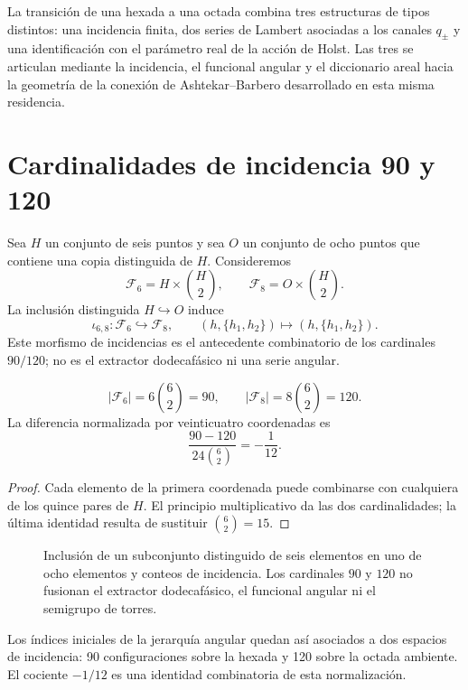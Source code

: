 \label{mdg:chap:barbero}

La transición de una hexada a una octada combina tres estructuras de tipos
distintos: una incidencia finita, dos series de Lambert asociadas a los
canales \(q_\pm\) y una identificación con el parámetro real de la acción de
Holst. Las tres se articulan mediante la incidencia, el funcional angular y
el diccionario areal hacia la geometría de la conexión de
Ashtekar--Barbero desarrollado en esta misma residencia.

\section{Cardinalidades de incidencia 90 y 120}

Sea \(H\) un conjunto de seis puntos y sea \(O\) un conjunto de ocho puntos
que contiene una copia distinguida de \(H\). Consideremos
\[
 \mathcal F_6=H\times\binom H2,
 \qquad
 \mathcal F_8=O\times\binom H2.
\]
La inclusión distinguida \(H\hookrightarrow O\) induce
\[
 \iota_{6,8}:\mathcal F_6\hookrightarrow\mathcal F_8,
 \qquad
 (h,\{h_1,h_2\})\longmapsto(h,\{h_1,h_2\}).
\]
Este morfismo de incidencias es el antecedente combinatorio de los
cardinales \(90/120\); no es el extractor dodecafásico ni una serie angular.

\begin{theorem}
\[
 |\mathcal F_6|=6\binom62=90,
 \qquad
 |\mathcal F_8|=8\binom62=120.
\]
La diferencia normalizada por veinticuatro coordenadas es
\[
 \frac{90-120}{24\binom62}=-\frac1{12}.
\]
\end{theorem}
\begin{proof}
Cada elemento de la primera coordenada puede combinarse con cualquiera de los
quince pares de \(H\). El principio multiplicativo da las dos cardinalidades;
la última identidad resulta de sustituir \(\binom62=15\).
\end{proof}

\begin{figure}[htbp]
\centering

\caption{Inclusión de un subconjunto distinguido de seis elementos en uno de
ocho elementos y conteos de incidencia. Los cardinales \(90\) y \(120\) no fusionan el extractor
dodecafásico, el funcional angular ni el semigrupo de torres.}
\label{mdg:fig:incidencia-seis-ocho-rev9}
\end{figure}

Los índices iniciales de la jerarquía angular quedan así asociados a dos
espacios de incidencia: 90 configuraciones sobre la hexada y 120 sobre la
octada ambiente. El cociente \(-1/12\) es una identidad combinatoria de esta
normalización.

